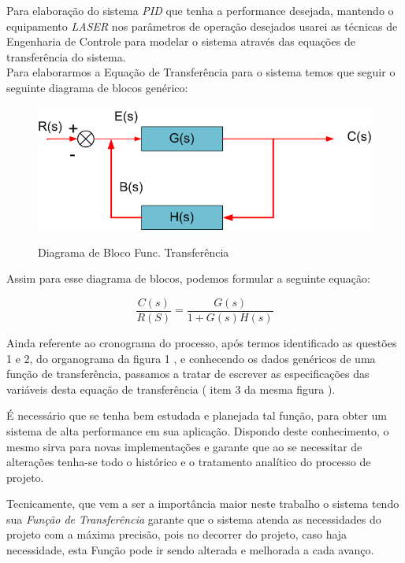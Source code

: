 \par Para elaboração do sistema \emph{PID} que tenha a performance desejada, mantendo o equipamento \emph{LASER} nos parâmetros de operação desejados usarei as técnicas de Engenharia de Controle para modelar o sistema através das equações de transferência do sistema.\\

Para elaborarmos a Equação de Transferência para o sistema temos que seguir o seguinte diagrama de blocos genérico:

\begin{figure}[H]
		\centering
		\includegraphics[width=0.7\linewidth]{./ima/DiagramaDeBlocos02Ftranferencia.png}
		\label{fig:FuncTransf}
		\caption{Diagrama de Bloco Func. Transferência}
	\end{figure}
	
Assim para esse diagrama de blocos, podemos formular a seguinte equação:

\[\frac{C(s)}{R(S)}= \frac{G(s)}{1+G(s)H(s)}\]

Ainda referente ao cronograma do processo, após termos identificado as questões 1 e 2, do organograma da figura 1 \label{fluxo1}, e conhecendo os dados genéricos de uma função de transferência, passamos a tratar de escrever as especificações das variáveis desta equação de transferência ( item 3 da mesma figura ).

É necessário que se tenha  bem estudada e planejada tal função, para  obter um sistema de alta performance em sua aplicação. Dispondo deste conhecimento, o mesmo sirva para novas implementações e garante que ao se necessitar de alterações tenha-se todo o histórico e o tratamento analítico do processo de projeto. 

Tecnicamente, que vem a ser a importância maior neste trabalho o sistema tendo sua \emph{Função de Transferência} garante que o sistema atenda as necessidades do projeto com a máxima precisão, pois no decorrer do projeto, caso haja necessidade, esta Função pode ir sendo alterada e melhorada a cada avanço.
